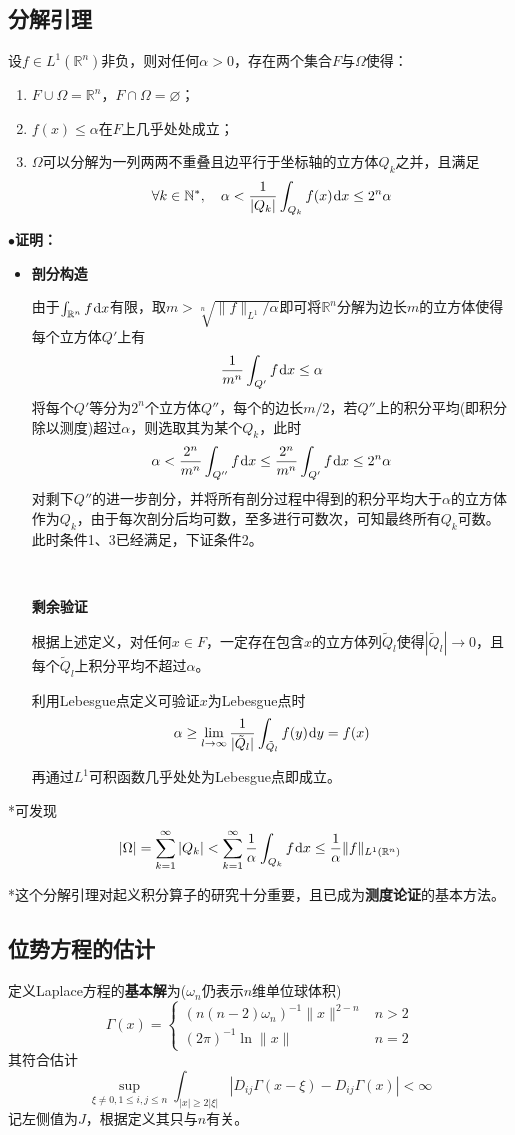 \documentclass[a4paper,UTF8,fontset=windows,AutoFakeBold]{ctexart}
\newcommand*{\dr}{\hspace{0.07em}\mathrm{d}}
\newcommand{\proo}[1]{{\kaishu $\bullet$\textbf{证明：}
\begin{itemize}
    \item[] #1
\end{itemize}
}}
\begin{document}
\subsection{分解引理}
设$f\in L^1(\mathbb{R}^n)$非负，则对任何$\alpha>0$，存在两个集合$F$与$\Omega$使得：
\begin{enumerate}
    \item $F\cup\Omega=\mathbb{R}^n$，$F\cap\Omega=\varnothing$；
    \item $f(x)\le\alpha$在$F$上几乎处处成立；
    \item $\Omega$可以分解为一列两两不重叠且边平行于坐标轴的立方体$Q_k$之并，且满足
    $$\forall k\in\mathbb{N}^*,\quad\alpha<\frac{1}{|Q_k|}\int_{Q_k}f(x)\dr x\le 2^n\alpha$$
\end{enumerate}

\proo{
    \textbf{剖分构造}

    由于$\int_{\mathbb{R}^n}f\dr x$有限，取$m>\sqrt[n]{\|f\|_{L^1}/\alpha}$即可将$\mathbb{R}^n$分解为边长$m$的立方体使得每个立方体$Q'$上有
    $$\frac{1}{m^n}\int_{Q'}f\dr x\le\alpha$$
    将每个$Q'$等分为$2^n$个立方体$Q''$，每个的边长$m/2$，若$Q''$上的积分平均(即积分除以测度)超过$\alpha$，则选取其为某个$Q_k$，此时
    $$\alpha<\frac{2^n}{m^n}\int_{Q''}f\dr x\le\frac{2^n}{m^n}\int_{Q'}f\dr x\le 2^n\alpha$$
    对剩下$Q''$的进一步剖分，并将所有剖分过程中得到的积分平均大于$\alpha$的立方体作为$Q_k$，由于每次剖分后均可数，至多进行可数次，可知最终所有$Q_k$可数。此时条件1、3已经满足，下证条件2。
    
    \

    \textbf{剩余验证}

    根据上述定义，对任何$x\in F$，一定存在包含$x$的立方体列$\tilde{Q}_l$使得$|\tilde{Q}_l|\to0$，且每个$\tilde{Q}_l$上积分平均不超过$\alpha$。

    利用Lebesgue点定义可验证$x$为Lebesgue点时
    $$\alpha\ge\lim_{l\to\infty}\frac{1}{|\tilde{Q}_l|}\int_{\tilde{Q}_l}f(y)\dr y=f(x)$$

    再通过$L^1$可积函数几乎处处为Lebesgue点即成立。
}

*可发现
$$|\Omega|=\sum_{k=1}^\infty|Q_k|<\sum_{k=1}^\infty\frac{1}{\alpha}\int_{Q_k}f\dr x\le\frac{1}{\alpha}\|f\|_{L^1(\mathbb{R}^n)}$$

*这个分解引理对起义积分算子的研究十分重要，且已成为\textbf{测度论证}的基本方法。

\subsection{位势方程的估计}
定义Laplace方程的\textbf{基本解}为($\omega_n$仍表示$n$维单位球体积)
$$\Gamma(x)=\begin{cases}(n(n-2)\omega_n)^{-1}\|x\|^{2-n}&n>2\\(2\pi)^{-1}\ln\|x\|&n=2\end{cases}$$
其符合估计
$$\sup_{\xi\ne0,1\le i,j\le n}\int_{|x|\ge2|\xi|}|D_{ij}\Gamma(x-\xi)-D_{ij}\Gamma(x)|<\infty$$
记左侧值为$J$，根据定义其只与$n$有关。
\end{document}
